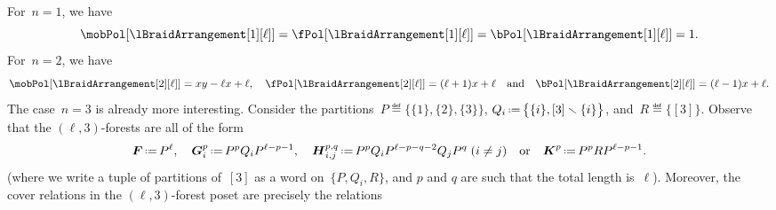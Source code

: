 \begin{example}
For~$n = 1$, we have
\[
\mobPol[{\lBraidArrangement[1][\ell]}] = \fPol[{\lBraidArrangement[1][\ell]}] = \bPol[{\lBraidArrangement[1][\ell]}] = 1.
\]
For~$n = 2$, we have
\[
\mobPol[{\lBraidArrangement[2][\ell]}] = xy-\ell x+\ell,
\quad
\fPol[{\lBraidArrangement[2][\ell]}] = (\ell+1)x+\ell
\quad\text{and}\quad
\bPol[{\lBraidArrangement[2][\ell]}] = (\ell-1)x+\ell.
\]
The case~$n = 3$ is already more interesting.
Consider the partitions~$P \eqdef \big\{ \{1\}, \{2\}, \{3\} \big\}$, $Q_i \eqdef \big\{ \{i\}, [3] \ssm \{i\} \big\}$, and~$R \eqdef \big\{ [3] \big\}$.
Observe that the $(\ell,3)$-forests are all of the form
\begin{gather*}
\b{F} \eqdef P^\ell,
\quad
\b{G}_i^p \eqdef P^p Q_i P^{\ell-p-1}, %
\quad
\b{H}_{i,j}^{p,q} \eqdef P^p Q_i P^{\ell-p-q-2} Q_j P^q \;\text{($i \ne j$)} %
\quad\text{or}\quad
\b{K}^p \eqdef P^p R P^{\ell-p-1}. %
\end{gather*}
(where we write a tuple of partitions of~$[3]$ as a word on~$\{P, Q_i, R\}$, and $p$ and $q$ are such that the total length is~$\ell$).
Moreover, the cover relations in the $(\ell,3)$-forest poset are precisely the relations

\end{example}
